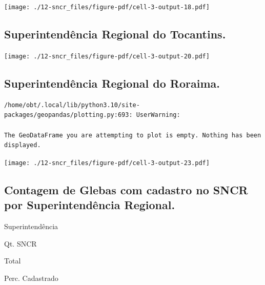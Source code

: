 \documentclass[
  letterpaper,
]{report}
\begin{document}
\texttt{[image: ./12-sncr\_files/figure-pdf/cell-3-output-18.pdf]}

\hypertarget{superintenduxeancia-regional-do-tocantins.-2}{%
\subsection{Superintendência Regional do
Tocantins.}\label{superintenduxeancia-regional-do-tocantins.-2}}

\texttt{[image: ./12-sncr\_files/figure-pdf/cell-3-output-20.pdf]}

\hypertarget{superintenduxeancia-regional-do-roraima.-2}{%
\subsection{Superintendência Regional do
Roraima.}\label{superintenduxeancia-regional-do-roraima.-2}}

\begin{verbatim}
/home/obt/.local/lib/python3.10/site-packages/geopandas/plotting.py:693: UserWarning:

The GeoDataFrame you are attempting to plot is empty. Nothing has been displayed.
\end{verbatim}

\texttt{[image: ./12-sncr\_files/figure-pdf/cell-3-output-23.pdf]}

\hypertarget{contagem-de-glebas-com-cadastro-no-sncr-por-superintenduxeancia-regional.}{%
\subsection{Contagem de Glebas com cadastro no SNCR por Superintendência
Regional.}\label{contagem-de-glebas-com-cadastro-no-sncr-por-superintenduxeancia-regional.}}

\n  

\n    

\n      

Superintendência

\n      

Qt. SNCR

\n      

Total

\n      

Perc. Cadastrado

\n    

\n  

\n  

\n    

\n      
\end{document}
